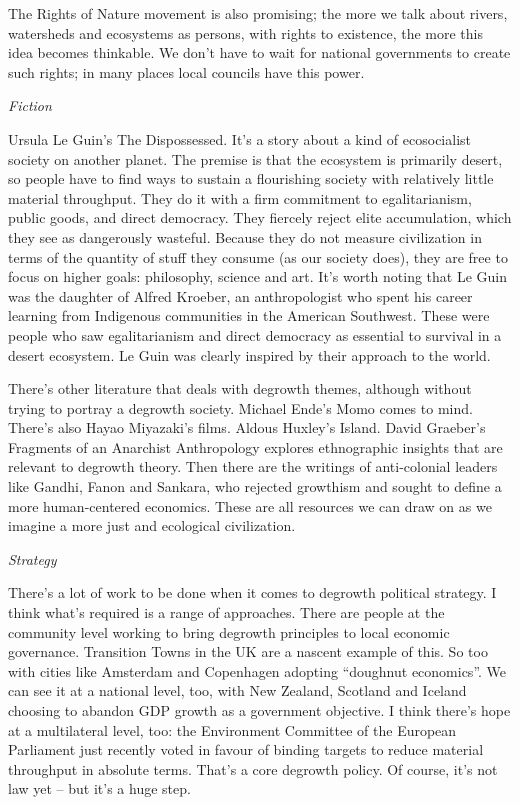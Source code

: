 \documentclass[
]{book}
\begin{document}
The Rights of Nature movement is also promising; the more we talk about rivers, watersheds and ecosystems as persons, with rights to existence, the more this idea becomes thinkable. We don't have to wait for national governments to create such rights; in many places local councils have this power.

\emph{Fiction}

Ursula Le Guin's The Dispossessed. It's a story about a kind of ecosocialist society on another planet. The premise is that the ecosystem is primarily desert, so people have to find ways to sustain a flourishing society with relatively little material throughput. They do it with a firm commitment to egalitarianism, public goods, and direct democracy. They fiercely reject elite accumulation, which they see as dangerously wasteful. Because they do not measure civilization in terms of the quantity of stuff they consume (as our society does), they are free to focus on higher goals: philosophy, science and art. It's worth noting that Le Guin was the daughter of Alfred Kroeber, an anthropologist who spent his career learning from Indigenous communities in the American Southwest. These were people who saw egalitarianism and direct democracy as essential to survival in a desert ecosystem. Le Guin was clearly inspired by their approach to the world.

There's other literature that deals with degrowth themes, although without trying to portray a degrowth society. Michael Ende's Momo comes to mind. There's also Hayao Miyazaki's films. Aldous Huxley's Island. David Graeber's Fragments of an Anarchist Anthropology explores ethnographic insights that are relevant to degrowth theory. Then there are the writings of anti-colonial leaders like Gandhi, Fanon and Sankara, who rejected growthism and sought to define a more human-centered economics. These are all resources we can draw on as we imagine a more just and ecological civilization.

\emph{Strategy}

There's a lot of work to be done when it comes to degrowth political strategy. I think what's required is a range of approaches. There are people at the community level working to bring degrowth principles to local economic governance. Transition Towns in the UK are a nascent example of this. So too with cities like Amsterdam and Copenhagen adopting ``doughnut economics''. We can see it at a national level, too, with New Zealand, Scotland and Iceland choosing to abandon GDP growth as a government objective. I think there's hope at a multilateral level, too: the Environment Committee of the European Parliament just recently voted in favour of binding targets to reduce material throughput in absolute terms. That's a core degrowth policy. Of course, it's not law yet -- but it's a huge step.
\end{document}

